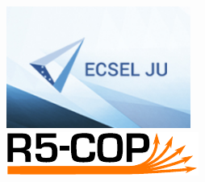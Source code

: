 \thispagestyle{empty}
{\noindent\centering\includegraphics[height=4cm]{pics/ecsel-logo}~~~~~~\\[3cm]}
{\noindent\centering\includegraphics{pics/r5-cop}\\[1cm]}

